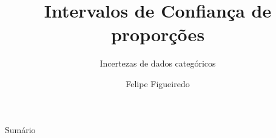 \documentclass{beamer}
\title%
{Intervalos de Confiança de proporções}
\subtitle
{Incertezas de dados categóricos} %
\author%
{Felipe Figueiredo}%
\institute[] %
{
}
\date%
{}
\begin{document}
\begin{frame}
  \titlepage
\end{frame}

\begin{frame}{Sumário}
  \tableofcontents
\end{frame}








\end{document}
